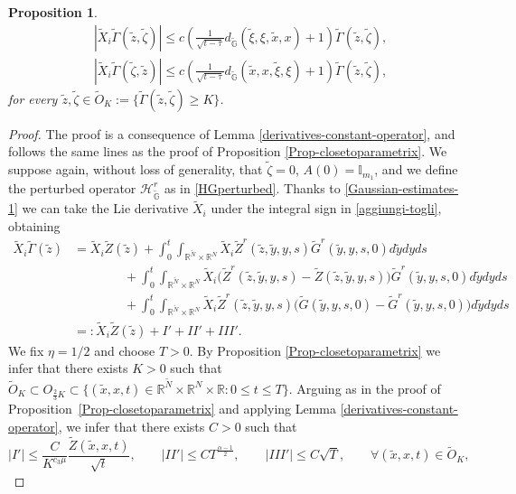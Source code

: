 \documentclass[11pt,a4paper]{article}
\newtheorem{proposition}[theorem]{\bf Proposition}
\numberwithin{equation}{section}
\newcommand{\R}{\mathbb{R}}
\def \rn {{\mathbb {R}}^{N}}
\def \rnm {{\mathbb {R}}^{\tilde N}}
\def \tt {\tilde}
\def \GG {{\mathbb{G}}}
\def \ti {\times}
\def \HG {\mathscr{H}_{\tilde\GG}}
\def \a {{\alpha}}
\def \G {{\Gamma}}
\def \t {{\tau}}
\def \x {{\xi}}
\def \y {{\eta}}
\def \z {{\zeta}}
\begin{document}
{{\begin{proposition}
\begin{equation}
\begin{aligned}
			&|\tt X_i \tt \G(\tt z,\tt \z)|\leq c \left(\frac{1}{\sqrt{t-\t}}d_{\tt\GG}(\tt \x,\x,\tt x,x) + 1 \right) \tt \G(\tt z,\tt \z),\\
			&|\tt X_i \tt \G(\tt \z,\tt z)|\leq c \left(\frac{1}{\sqrt{t-\t}}d_{\tt\GG}(\tt x,x,\tt \x, \x) + 1 \right) \tt \G(\tt z,\tt \z),
		\end{aligned}
	\end{equation}
	for every $\tt z,\tt \z \in \tt O_K:=\big\{\tt\G(\tt z,\tt \z)\geq K\big\}$. 
\end{proposition}
\begin{proof}
	The proof is a consequence of Lemma \ref{derivatives-constant-operator}, and follows the same lines as the proof of Proposition \ref{Prop-closetoparametrix}. We suppose again, without loss of generality, that $\tt \z = 0$,  $A(0)=\mathbb{I}_{m_1}$,  and we define the perturbed operator $\HG^r$ as in \eqref{HGperturbed}. Thanks to \eqref{Gaussian-estimates-1} we can take the Lie derivative $\tt X_i$ under the integral sign in \eqref{aggiungi-togli}, obtaining 
	\begin{equation}\label{aggiungi-togli-derivate}
		\begin{aligned}
			\tt X_i\tt \G(\tt z) &= \tt X_i\tt Z (\tt z) +\! \!\int_0^t\! \!\int_{\rnm\ti \rn} \!\!\!\!\!\!\!\!\tt X_i\tt Z^r(\tt z, \tt y, y, s) \tt G^r(\tt y,y, s,0) d\tt y d y d s \\
			&\qquad \qquad +\!\!\int_0^t\! \!\int_{\rnm\ti \rn}\!\!\!\!\!\!\!\! \tt X_i\Big( \tt Z^r(\tt z, \tt y, y, s) -\tt Z (\tt z, \tt y,y, s) \Big)\tt G^r(\tt y,y, s,0) d\tt y d y d s\\
			&\qquad \qquad +\!\!\int_0^t\! \!\int_{\rnm\ti \rn} \!\!\!\!\!\!\!\!\tt X_i\tt Z^r(\tt z,\tt  y, y, s) \Big(\tt G (\tt y,y, s,0)-\tt G^r(\tt y,y, s,0)\Big)  d\tt y d y d s \\
			&=:\tt X_i\tt Z (\tt z)+ I' +II'+III'.		
		\end{aligned}
	\end{equation}
	We fix $\y=1/2$ and choose $T>0$. By Proposition \ref{Prop-closetoparametrix} we infer that there exists $K>0$ such that $\tt O_K\subset O_{\frac{2}{3}K}\subset  \Big\{(\tt x,x, t)\in \rnm\ti\rn\ti\R : 0\leq t\leq T\Big\}$. Arguing as in the proof of Proposition~\ref{Prop-closetoparametrix} and applying Lemma \ref{derivatives-constant-operator}, we infer that there exists $C>0$ such that
	\begin{equation}
		|I'| \leq \frac{C}{K^{c_3 \mu}}\frac{\tt Z(\tt x,x,t)}{\sqrt{t}},\qquad |II'|\leq C T^\frac{\a-1}{2}, \qquad |III'|\leq C \sqrt{T},\qquad \forall (\tt x,x,t)\in \tt O_{K},

\end{equation}
\end{proof}}}
\end{document}
